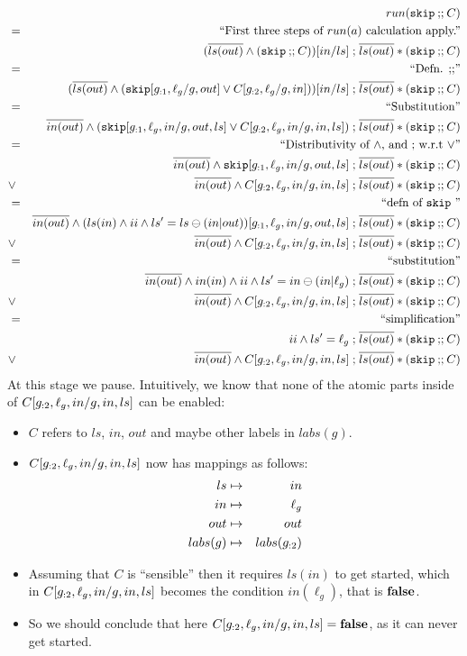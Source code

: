 \begin{eqnarray*}
  && run(\cskip \cseq C)
\EQ{First three steps of $run(a)$ calculation apply.}
\\&& (\B{ls(out)} \land (\cskip \cseq C)) [in/ls] \seq \B{ls(out)} * (\cskip \cseq C)
\EQ{Defn. $\cseq$}
\\&& ( \B{ls(out)}
       \land ( \cskip[\g{:1},\ell_g/g,out]
               \lor
                C[\g{:2},\ell_g/g,in]
              )
     ) [in/ls]
     \seq \B{ls(out)} * (\cskip \cseq C)
\EQ{Substitution}
\\&& \B{in(out)}
       \land ( \cskip[\g{:1},\ell_g,in/g,out,ls]
               \lor
                C[\g{:2},\ell_g,in/g,in,ls]
              )
     \seq \B{ls(out)} * (\cskip \cseq C)
\EQ{Distributivity of $\land$, and $\seq$ w.r.t $\lor$}
\\&& \B{in(out)}
       \land \cskip[\g{:1},\ell_g,in/g,out,ls]
     \seq \B{ls(out)} * (\cskip \cseq C)
\\&\lor&
     \B{in(out)}
       \land C[\g{:2},\ell_g,in/g,in,ls]
     \seq \B{ls(out)} * (\cskip \cseq C)
\EQ{defn of $\cskip$ }
\\&& \B{in(out)}
       \land (ls(in) \land ii \land ls'=ls \ominus (in|out))[\g{:1},\ell_g,in/g,out,ls]
     \seq \B{ls(out)} * (\cskip \cseq C)
\\&\lor&
     \B{in(out)}
       \land C[\g{:2},\ell_g,in/g,in,ls]
     \seq \B{ls(out)} * (\cskip \cseq C)
\EQ{substitution}
\\&& \B{in(out)}
       \land in(in) \land ii \land ls'=in \ominus (in|\ell_g)
     \seq \B{ls(out)} * (\cskip \cseq C)
\\&\lor&
     \B{in(out)}
       \land C[\g{:2},\ell_g,in/g,in,ls]
     \seq \B{ls(out)} * (\cskip \cseq C)
\EQ{simplification}
\\&& ii \land ls'=\ell_g
     \seq \B{ls(out)} * (\cskip \cseq C)
\\&\lor&
     \B{in(out)}
       \land C[\g{:2},\ell_g,in/g,in,ls]
     \seq \B{ls(out)} * (\cskip \cseq C)
\end{eqnarray*}
At this stage we pause.
Intuitively, we know that none of the atomic parts
inside of $ C[g_{:2},\ell_g,in/g,in,ls]$ can be enabled:
\begin{itemize}
  \item
    $C$ refers to $ls$, $in$, $out$
    and maybe other labels in $labs(g)$.
  \item
    $C[g_{:2},\ell_g,in/g,in,ls]$
    now has mappings as follows:
    \begin{eqnarray*}
       ls &\mapsto& in
    \\ in &\mapsto& \ell_g
    \\ out &\mapsto& out
    \\ labs(g) &\mapsto& labs(g_{:2})
    \end{eqnarray*}
  \item
    Assuming that $C$ is ``sensible'' then it requires
    $ls(in)$ to get started,
    which in $C[g_{:2},\ell_g,in/g,in,ls]$
    becomes the condition $in(\ell_g)$, that is $\mathbf{false}$.
  \item
    So we should conclude that here
    $C[g_{:2},\ell_g,in/g,in,ls]=\mathbf{false}$,
    as it can never get started.
\end{itemize}
